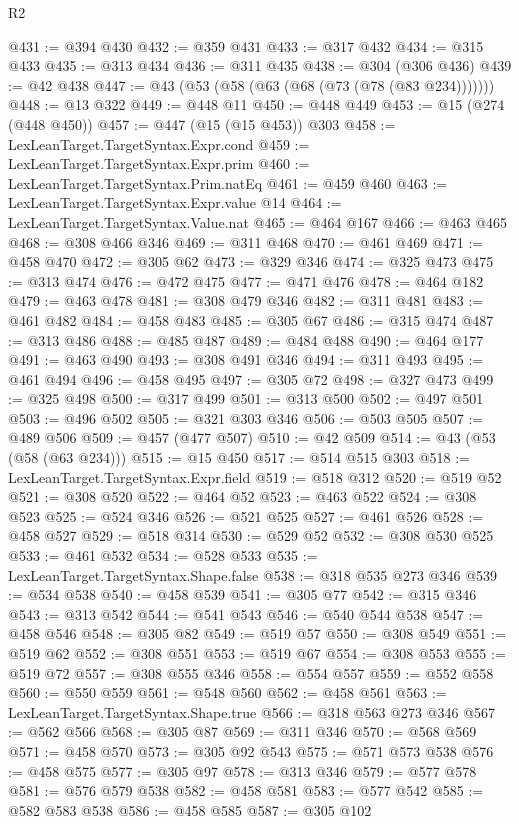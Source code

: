 \begin{lexlean}{R2}
\begin{coremodule}
@431 := @394 @430
@432 := @359 @431
@433 := @317 @432
@434 := @315 @433
@435 := @313 @434
@436 := @311 @435
@438 := @304 (@306 @436)
@439 := @42 @438
@447 := @43 (@53 (@58 (@63 (@68 (@73 (@78 (@83 @234)))))))
@448 := @13 @322
@449 := @448 @11
@450 := @448 @449
@453 := @15 (@274 (@448 @450))
@457 := @447 (@15 (@15 @453)) @303
@458 := LexLeanTarget.TargetSyntax.Expr.cond
@459 := LexLeanTarget.TargetSyntax.Expr.prim
@460 := LexLeanTarget.TargetSyntax.Prim.natEq
@461 := @459 @460
@463 := LexLeanTarget.TargetSyntax.Expr.value @14
@464 := LexLeanTarget.TargetSyntax.Value.nat
@465 := @464 @167
@466 := @463 @465
@468 := @308 @466 @346
@469 := @311 @468
@470 := @461 @469
@471 := @458 @470
@472 := @305 @62
@473 := @329 @346
@474 := @325 @473
@475 := @313 @474
@476 := @472 @475
@477 := @471 @476
@478 := @464 @182
@479 := @463 @478
@481 := @308 @479 @346
@482 := @311 @481
@483 := @461 @482
@484 := @458 @483
@485 := @305 @67
@486 := @315 @474
@487 := @313 @486
@488 := @485 @487
@489 := @484 @488
@490 := @464 @177
@491 := @463 @490
@493 := @308 @491 @346
@494 := @311 @493
@495 := @461 @494
@496 := @458 @495
@497 := @305 @72
@498 := @327 @473
@499 := @325 @498
@500 := @317 @499
@501 := @313 @500
@502 := @497 @501
@503 := @496 @502
@505 := @321 @303 @346
@506 := @503 @505
@507 := @489 @506
@509 := @457 (@477 @507)
@510 := @42 @509
@514 := @43 (@53 (@58 (@63 @234)))
@515 := @15 @450
@517 := @514 @515 @303
@518 := LexLeanTarget.TargetSyntax.Expr.field
@519 := @518 @312
@520 := @519 @52
@521 := @308 @520
@522 := @464 @52
@523 := @463 @522
@524 := @308 @523
@525 := @524 @346
@526 := @521 @525
@527 := @461 @526
@528 := @458 @527
@529 := @518 @314
@530 := @529 @52
@532 := @308 @530 @525
@533 := @461 @532
@534 := @528 @533
@535 := LexLeanTarget.TargetSyntax.Shape.false
@538 := @318 @535 @273 @346
@539 := @534 @538
@540 := @458 @539
@541 := @305 @77
@542 := @315 @346
@543 := @313 @542
@544 := @541 @543
@546 := @540 @544 @538
@547 := @458 @546
@548 := @305 @82
@549 := @519 @57
@550 := @308 @549
@551 := @519 @62
@552 := @308 @551
@553 := @519 @67
@554 := @308 @553
@555 := @519 @72
@557 := @308 @555 @346
@558 := @554 @557
@559 := @552 @558
@560 := @550 @559
@561 := @548 @560
@562 := @458 @561
@563 := LexLeanTarget.TargetSyntax.Shape.true
@566 := @318 @563 @273 @346
@567 := @562 @566
@568 := @305 @87
@569 := @311 @346
@570 := @568 @569
@571 := @458 @570
@573 := @305 @92 @543
@575 := @571 @573 @538
@576 := @458 @575
@577 := @305 @97
@578 := @313 @346
@579 := @577 @578
@581 := @576 @579 @538
@582 := @458 @581
@583 := @577 @542
@585 := @582 @583 @538
@586 := @458 @585
@587 := @305 @102

\end{coremodule}
\end{lexlean}

